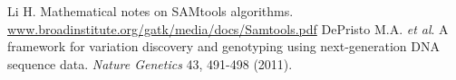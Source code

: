 \documentclass{article}
\begin{document}
\clearpage
\begin{thebibliography}{9}
Li H. Mathematical notes on SAMtools algorithms. \url{www.broadinstitute.org/gatk/media/docs/Samtools.pdf}
DePristo M.A. \emph{et al}. A framework for variation discovery and genotyping using next-generation DNA sequence data. \emph{Nature Genetics} 43, 491-498 (2011).
\end{thebibliography}
\end{document}
